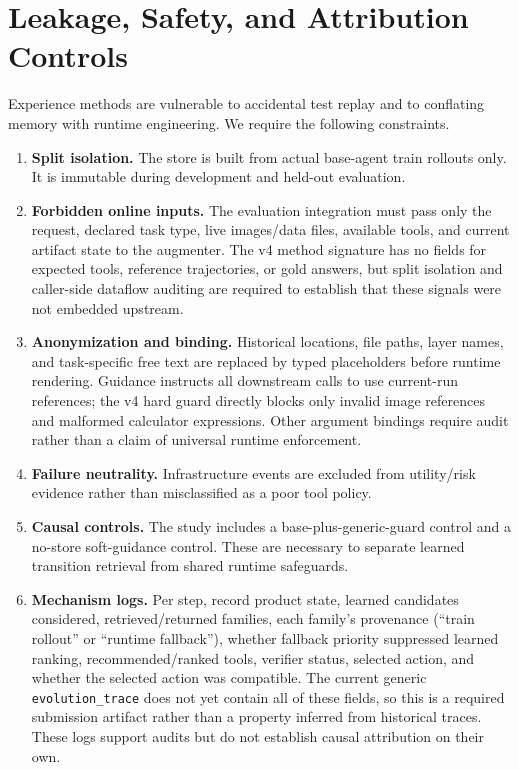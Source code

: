 \documentclass[10pt]{article}
\begin{document}
\section{Leakage, Safety, and Attribution Controls}
\label{sec:controls}
Experience methods are vulnerable to accidental test replay and to conflating memory with runtime engineering. We require the following constraints.
\begin{enumerate}
\item \textbf{Split isolation.} The store is built from actual base-agent train rollouts only. It is immutable during development and held-out evaluation.
\item \textbf{Forbidden online inputs.} The evaluation integration must pass only the request, declared task type, live images/data files, available tools, and current artifact state to the augmenter. The v4 method signature has no fields for expected tools, reference trajectories, or gold answers, but split isolation and caller-side dataflow auditing are required to establish that these signals were not embedded upstream.
\item \textbf{Anonymization and binding.} Historical locations, file paths, layer names, and task-specific free text are replaced by typed placeholders before runtime rendering. Guidance instructs all downstream calls to use current-run references; the v4 hard guard directly blocks only invalid image references and malformed calculator expressions. Other argument bindings require audit rather than a claim of universal runtime enforcement.
\item \textbf{Failure neutrality.} Infrastructure events are excluded from utility/risk evidence rather than misclassified as a poor tool policy.
\item \textbf{Causal controls.} The study includes a base-plus-generic-guard control and a no-store soft-guidance control. These are necessary to separate learned transition retrieval from shared runtime safeguards.
\item \textbf{Mechanism logs.} Per step, record product state, learned candidates considered, retrieved/returned families, each family's provenance (``train rollout'' or ``runtime fallback''), whether fallback priority suppressed learned ranking, recommended/ranked tools, verifier status, selected action, and whether the selected action was compatible. The current generic \texttt{evolution\_trace} does not yet contain all of these fields, so this is a required submission artifact rather than a property inferred from historical traces. These logs support audits but do not establish causal attribution on their own.
\end{enumerate}
\end{document}
